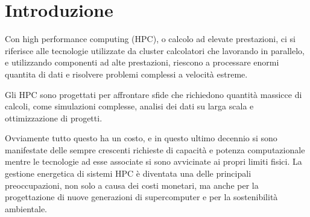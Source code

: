\chapter{Introduzione}



Con high performance computing (HPC), o calcolo ad elevate prestazioni, ci si riferisce alle tecnologie utilizzate da cluster calcolatori che lavorando in parallelo, e utilizzando componenti ad alte prestazioni, riescono a processare enormi quantita di dati e risolvere problemi complessi a velocità estreme.

Gli HPC sono progettati per affrontare sfide che richiedono quantità massicce di calcoli, come simulazioni complesse, analisi dei dati su larga scala e ottimizzazione di progetti.  %

Ovviamente tutto questo ha un costo, e in questo ultimo decennio si sono manifestate delle sempre crescenti richieste di capacità e potenza computazionale mentre le tecnologie ad esse associate si sono avvicinate ai propri limiti fisici.
La gestione energetica di sistemi HPC è diventata una delle principali preoccupazioni, non solo a causa dei costi monetari, ma anche per la progettazione di nuove generazioni %
di supercomputer e per la sostenibilità ambientale. 


